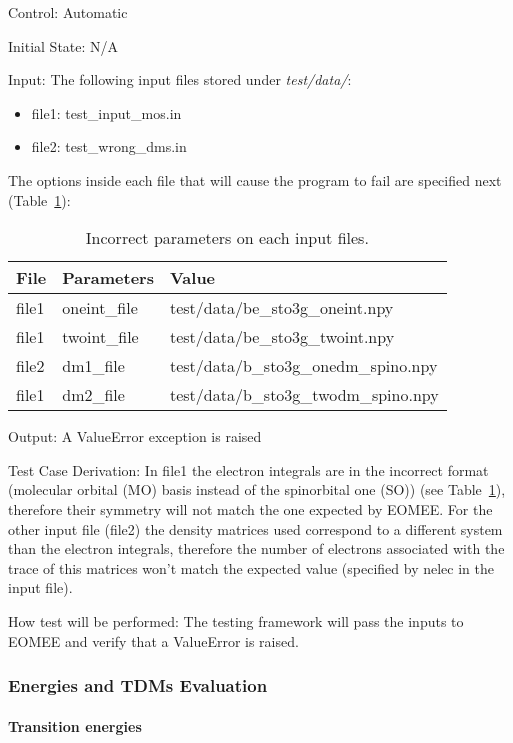 \documentclass[12pt, titlepage]{article}
\begin{document}
\begin{enumerate}
Control: Automatic

Initial State: N/A

Input: The following input files stored under \textit{test/data/}: 
\begin{itemize}
	\item file1: test\_input\_mos.in
	\item file2: test\_wrong\_dms.in
\end{itemize}
The options inside each file that will cause the program to fail are specified 
next (Table~\ref{table:wrongdata}):
\begin{table}[h!]
	\centering
	\begin{tabular}{lll}
		File&Parameters& Value\\
		\midrule
		file1&oneint\_file& test/data/be\_sto3g\_oneint.npy\\
		file1&twoint\_file & test/data/be\_sto3g\_twoint.npy\\ 
		file2&dm1\_file & test/data/b\_sto3g\_onedm\_spino.npy\\
		file1&dm2\_file & test/data/b\_sto3g\_twodm\_spino.npy\\
		\bottomrule
	\end{tabular}
	\caption{Incorrect parameters on each input files.}
	\label{table:wrongdata}
\end{table}

Output: A ValueError exception is raised 

Test Case Derivation: In file1 the electron integrals are in the incorrect 
format (molecular orbital (MO) basis instead of the spinorbital one (SO)) (see 
Table~\ref{table:wrongdata}), therefore their symmetry will not match the one 
expected by EOMEE. For the other input file (file2) the density matrices used 
correspond to a different system than the electron integrals, therefore the 
number of electrons associated with the trace of this matrices won't match the 
expected value (specified by nelec in the input file).

How test will be performed: The testing framework 
will pass the inputs to EOMEE and verify that a ValueError is raised.

\end{enumerate}

\subsubsection{Energies and TDMs Evaluation}
\label{section:calculations}

\paragraph{Transition energies\\}
\end{document}
